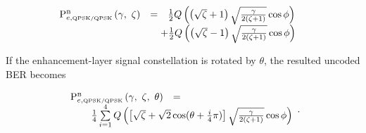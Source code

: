\documentclass[conference]{IEEEtran}
\begin{document}
\begin{equation}\hspace{-0.15in}
\begin{array}{rcl}
{\rm P}_{e,\mbox{\tiny QPSK/QPSK}}^{\mbox{\tiny B}}\left(\gamma,\ \zeta\right)&=&\frac{1}{2}Q\left(\left(\sqrt{\zeta}+1\right)\sqrt{\frac{\gamma}{2(\zeta+1)}}\cos\phi\right)\\
&&\hspace{-0.10in}+\frac{1}{2}Q\left(\left(\sqrt{\zeta}-1\right)\sqrt{\frac{\gamma}{2(\zeta+1)}}\cos\phi\right)
\end{array}\label{BL_BER}
\end{equation}

\noindent If the enhancement-layer signal constellation is rotated
by $\theta$, the resulted uncoded BER becomes

\begin{equation}%
\begin{array}{rcl}
{\rm P}_{e,\mbox{\tiny QPSK/QPSK}}^{\mbox{\tiny B}}\left(\gamma,\ \zeta,\ \theta\right)&=&\\
&&\hspace{-1.4in}\frac{1}{4}\sum\limits_{i=1}^{4}Q\left(\left[\sqrt{\zeta}+\sqrt{2}\cos(\theta+\frac{i}{4}\pi)\right]\sqrt{\frac{\gamma}{2(\zeta+1)}}\cos\phi\right)
\end{array}.\label{BL_BER_rotated}
\end{equation}
\end{document}

